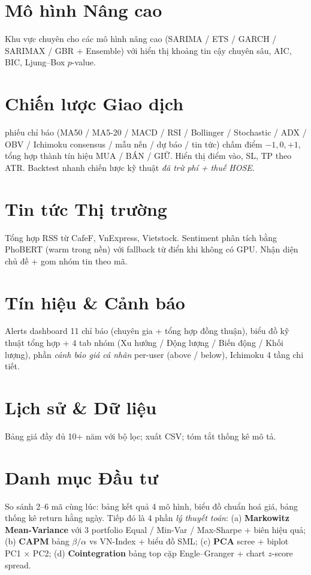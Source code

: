 \documentclass[12pt,a4paper,openany,oneside]{report}
\numberwithin{equation}{chapter}
\begin{document}
\section{Mô hình Nâng cao}

\indent Khu vực chuyên cho các mô hình nâng cao (SARIMA / ETS / GARCH /
SARIMAX / GBR + Ensemble) với hiển thị khoảng tin cậy chuyên sâu, AIC,
BIC, Ljung--Box $p$-value.

\section{Chiến lược Giao dịch}

 phiếu chỉ báo (MA50 / MA5-20 / MACD / RSI / Bollinger /
Stochastic / ADX / OBV / Ichimoku consensus / mẫu nến / dự báo / tin
tức) chấm điểm $-1, 0, +1$, tổng hợp thành tín hiệu MUA / BÁN / GIỮ.
Hiển thị điểm vào, SL, TP theo ATR. Backtest nhanh chiến lược kỹ thuật
\emph{đã trừ phí + thuế HOSE}.

\section{Tin tức Thị trường}

\indent Tổng hợp RSS từ CafeF, VnExpress, Vietstock. Sentiment phân tích
bằng PhoBERT (warm trong nền) với fallback từ điển khi không có GPU.
Nhận diện chủ đề + gom nhóm tin theo mã.

\section{Tín hiệu \& Cảnh báo}

\indent Alerts dashboard 11 chỉ báo (chuyên gia + tổng hợp đồng thuận),
biểu đồ kỹ thuật tổng hợp + 4 tab nhóm (Xu hướng / Động lượng / Biến
động / Khối lượng), phần \emph{cảnh báo giá cá nhân} per-user (above /
below), Ichimoku 4 tầng chi tiết.

\section{Lịch sử \& Dữ liệu}

\indent Bảng giá đầy đủ 10+ năm với bộ lọc; xuất CSV; tóm tắt thống kê
mô tả.

\section{Danh mục Đầu tư}

\indent So sánh 2--6 mã cùng lúc: bảng kết quả 4 mô hình, biểu đồ chuẩn
hoá giá, bảng thống kê return hằng ngày. Tiếp đó là 4 phần \emph{lý
thuyết toán}: (a) \textbf{Markowitz Mean-Variance} với 3 portfolio Equal
/ Min-Var / Max-Sharpe + biên hiệu quả; (b) \textbf{CAPM} bảng $\beta /
\alpha$ vs VN-Index + biểu đồ SML; (c) \textbf{PCA} scree + biplot PC1
× PC2; (d) \textbf{Cointegration} bảng top cặp Engle--Granger + chart
$z$-score spread.
\end{document}
